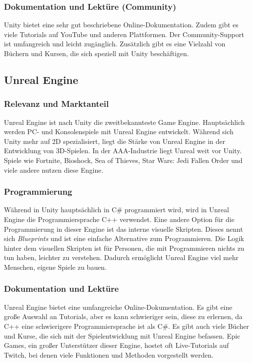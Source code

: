 \subsubsection{Dokumentation und Lektüre (Community)}
Unity bietet eine sehr gut beschriebene Online-Dokumentation. Zudem gibt es viele Tutorials auf YouTube und anderen Plattformen. Der Community-Support ist umfangreich und leicht zugänglich. Zusätzlich gibt es eine Vielzahl von Büchern und Kursen, die sich speziell mit Unity beschäftigen.

\pagebreak

\subsection{Unreal Engine}
\subsubsection{Relevanz und Marktanteil}
Unreal Engine ist nach Unity die zweitbekannteste Game Engine. Hauptsächlich werden PC- und Konsolenspiele mit Unreal Engine entwickelt. Während sich Unity mehr auf 2D spezialisiert, liegt die Stärke von Unreal Engine in der Entwicklung von 3D-Spielen. In der AAA-Industrie liegt Unreal weit vor Unity. Spiele wie Fortnite, Bioshock, Sea of Thieves, Star Wars: Jedi Fallen Order und viele andere nutzen diese Engine.

\subsubsection{Programmierung}
Während in Unity hauptsächlich in C\# programmiert wird, wird in Unreal Engine die Programmiersprache C++ verwendet. Eine andere Option für die Programmierung in dieser Engine ist das interne visuelle Skripten. Dieses nennt sich \textit{Blueprints} und ist eine einfache Alternative zum Programmieren. Die Logik hinter dem visuellen Skripten ist für Personen, die mit Programmieren nichts zu tun haben, leichter zu verstehen. Dadurch ermöglicht Unreal Engine viel mehr Menschen, eigene Spiele zu bauen.

\subsubsection{Dokumentation und Lektüre}
Unreal Engine bietet eine umfangreiche Online-Dokumentation. Es gibt eine große Auswahl an Tutorials, aber es kann schwieriger sein, diese zu erlernen, da C++ eine schwierigere Programmiersprache ist als C\#. Es gibt auch viele Bücher und Kurse, die sich mit der Spielentwicklung mit Unreal Engine befassen. Epic Games, ein großer Unterstützer dieser Engine, hostet oft Live-Tutorials auf Twitch, bei denen viele Funktionen und Methoden vorgestellt werden.

